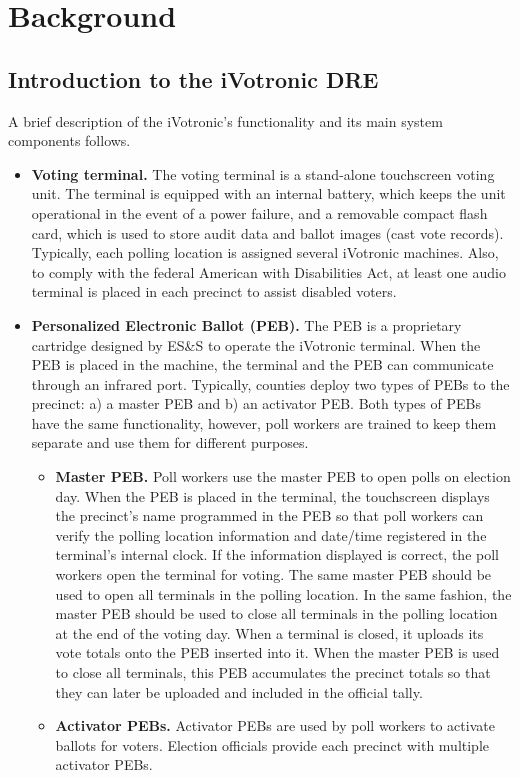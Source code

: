 \section{Background}
\label{sec:background}
\subsection{Introduction to the iVotronic DRE}
A brief description of the iVotronic's functionality and its main
system components follows. 

\begin{itemize} 
\item \textbf{Voting terminal.} The voting terminal is a stand-alone
  touchscreen voting unit.  The terminal is equipped with an internal
  battery, which keeps the unit operational in the event of a power
  failure, and a removable compact flash card, which is used to store
  audit data and ballot images (cast vote records). Typically, each
  polling location is assigned several iVotronic machines. Also, to
  comply with the federal American with Disabilities Act, at least one
  audio terminal is placed in each precinct to assist disabled
  voters. 

\item \textbf{Personalized Electronic Ballot (PEB).} The PEB is a
  proprietary cartridge designed by ES\&S to operate the iVotronic
  terminal.  When the PEB is placed in the machine, the terminal and
  the PEB can communicate through an infrared port.  Typically,
  counties deploy two types of PEBs to the precinct: a) a master PEB
  and b) an activator PEB. Both types of PEBs have the same
  functionality, however, poll workers are trained to keep them
  separate and use them for different purposes. 
    \begin{itemize}
    \item \textbf{Master PEB.}  Poll workers use the master PEB to
      open polls on election day. When the PEB is placed in the
      terminal, the touchscreen displays the precinct's name
      programmed in the PEB so that poll workers can verify the
      polling location information and date/time registered in the
      terminal's internal clock. If the information displayed is
      correct, the poll workers open the terminal for voting. The same
      master PEB should be used to open all terminals in the polling
      location. In the same fashion, the master PEB should be used to
      close all terminals in the polling location at the end of the
      voting day. When a terminal is closed, it uploads its vote
      totals onto the PEB inserted into it. When the master PEB is
      used to close all terminals, this PEB accumulates the precinct
      totals so that they can later be uploaded and included in the
      official tally. 
    \item \textbf{Activator PEBs.}  Activator PEBs are used by  poll
      workers to activate ballots for voters. Election officials
      provide each precinct with multiple activator PEBs.  
    \end{itemize}
\end{itemize}
